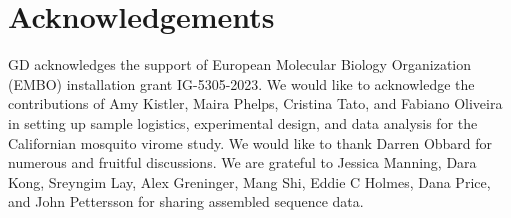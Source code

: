 \documentclass[11pt]{article}
\begin{document}
\section{Acknowledgements}
GD acknowledges the support of European Molecular Biology Organization (EMBO) installation grant IG-5305-2023.
We would like to acknowledge the contributions of Amy Kistler, Maira Phelps, Cristina Tato, and Fabiano Oliveira in setting up sample logistics, experimental design, and data analysis for the Californian mosquito virome study.
We would like to thank Darren Obbard for numerous and fruitful discussions.
We are grateful to Jessica Manning, Dara Kong, Sreyngim Lay, Alex Greninger, Mang Shi, Eddie C Holmes, Dana Price, and John Pettersson for sharing assembled sequence data.


\clearpage











\end{document}
